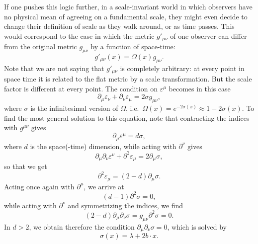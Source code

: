 \documentclass[a4paper,12pt]{article}
\numberwithin{equation}{section}
\begin{document}
If one pushes this logic further, in a scale-invariant world in which observers have no physical mean of agreeing on a fundamental scale, they might even decide to change their definition of scale as they walk around, or as time passes. This would correspond to the case in which the metric $g'_{\mu\nu}$ of one observer can differ from the original metric $g_{\mu\nu}$ by a function of space-time:
\begin{equation}
	g'_{\mu\nu}(x) = \Omega(x) g_{\mu\nu}.
\end{equation}
Note that we are not saying that $g'_{\mu\nu}$ is completely arbitrary: at every point in space time it is related to the flat metric by a scale transformation. But the scale factor is different at every point.
The condition on $\varepsilon^\mu$ becomes in this case
\begin{equation}
	\partial_\mu \varepsilon_\nu
	+ \partial_\nu \varepsilon_\mu = 2 \sigma g_{\mu\nu},
	\label{eq:conformalkillingeq}
\end{equation}
where $\sigma$ is the infinitesimal version of $\Omega$, i.e.~$\Omega(x) = e^{-2 \sigma(x)} \approx 1 - 2\sigma(x)$. To find the most general solution to this equation, note that contracting the indices with $g^{\mu\nu}$ gives
\begin{equation}
	\partial_\mu \varepsilon^\mu  = d \sigma,
\end{equation}
where $d$ is the space(-time) dimension,
while acting with $\partial^\nu$ gives
\begin{equation}
	\partial_\mu \partial_\nu \varepsilon^\nu
	+ \partial^2 \varepsilon_\mu
	= 2 \partial_\mu\sigma,
\end{equation}
so that we get
\begin{equation}
	\partial^2 \varepsilon_\mu
	= (2 - d) \partial_\mu\sigma.
\end{equation}
Acting once again with $\partial^\mu$, we arrive at 
\begin{equation}
	(d - 1) \partial^2 \sigma = 0,
\end{equation}
while acting with $\partial^\nu$ and symmetrizing the indices, we find
\begin{equation}
	(2 - d) \partial_\mu\partial_\nu \sigma
	= g_{\mu\nu} \partial^2 \sigma
	= 0.
\end{equation}
In $d > 2$, we obtain therefore the condition $\partial_\mu \partial_\nu \sigma = 0$, which is solved by 
\begin{equation}
	\sigma(x) = \lambda + 2 b \cdot x.
\end{equation}
\end{document}
